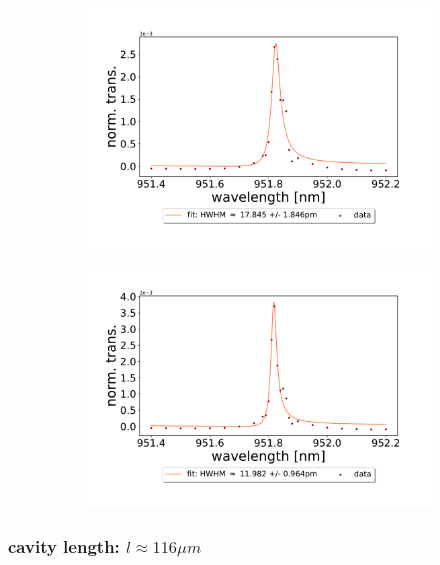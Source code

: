 \begin{figure}[h!]
\begin{subfigure}[b]{0.49\textwidth}
        \includegraphics[width=\textwidth]{figures/results/single fano fits/220um_M5_fit_3.pdf}
        \caption{}
        \label{fig:220um_M5_fit_3}
    \end{subfigure}
    \begin{subfigure}[b]{0.49\textwidth}
        \includegraphics[width=\textwidth]{figures/results/single fano fits/220um_M5_fit_4.pdf}
        \caption{}
        \label{fig:220um_M5_fit_4}
    \end{subfigure}
\end{figure}

\clearpage
\subsubsection*{cavity length: $l \approx 116 \mu m$}

